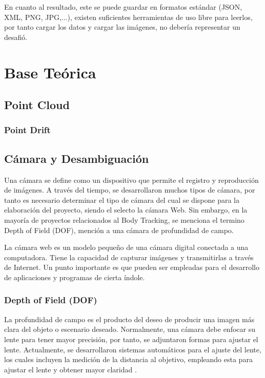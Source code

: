 En cuanto al resultado, este se puede guardar en formatos estándar (JSON, XML, PNG, JPG,...), existen suficientes herramientas de uso libre para leerlos, por tanto cargar los datos y cargar las imágenes, no debería representar un desafió.

\section{Base Teórica}

\subsection{Point Cloud}

\subsubsection{Point Drift}


\subsection{Cámara y Desambiguación}

Una cámara se define como un dispositivo que permite el registro y reproducción de imágenes. A través del tiempo, se desarrollaron muchos tipos de cámara, por tanto es necesario determinar el tipo de cámara del cual se dispone para la elaboración del proyecto, siendo el selecto la cámara Web. Sin embargo, en la mayoría de proyectos relacionados al Body Tracking, se menciona el termino Depth of Field (DOF), mención a una cámara de profundidad de campo.

La cámara web es un modelo pequeño de una cámara digital conectada a una computadora. Tiene la capacidad de capturar imágenes y transmitirlas a través de Internet. Un punto importante es que pueden ser empleadas para el desarrollo de aplicaciones y programas de cierta índole. 


\subsubsection{Depth of Field (DOF)}

La profundidad de campo es el producto del deseo de producir una imagen más clara del objeto o escenario deseado. Normalmente, una cámara debe enfocar su lente para tener mayor precisión, por tanto, se adjuntaron formas para ajustar el lente. Actualmente, se desarrollaron sistemas automáticos para el ajuste del lente, los cuales incluyen la medición de la distancia al objetivo, empleando esta para ajustar el lente y obtener mayor claridad \cite{madsen2000depth}. 

